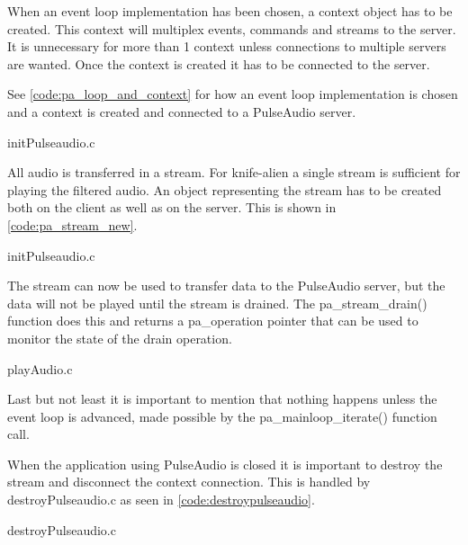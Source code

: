 \documentclass[journal]{IEEEtran}
\begin{document}
When an event loop implementation has been chosen, a context object has to be created. This context will multiplex events, commands and streams to the server. It is unnecessary for more than 1 context unless connections to multiple servers are wanted.
Once the context is created it has to be connected to the server.

See \autoref*{code:pa_loop_and_context} for how an event loop implementation is chosen and a context is created and connected to a PulseAudio server.


{initPulseaudio.c}

All audio is transferred in a stream. For knife-alien a single stream is sufficient for playing the filtered audio. An object representing the stream has to be created both on the client as well as on the server. This is shown in \autoref*{code:pa_stream_new}.


{initPulseaudio.c}

The stream can now be used to transfer data to the PulseAudio server, but the data will not be played until the stream is drained. The pa\_stream\_drain() function does this and returns a pa\_operation pointer that can be used to monitor the state of the drain operation.


{playAudio.c}

Last but not least it is important to mention that nothing happens unless the event loop is advanced, made possible by the pa\_mainloop\_iterate() function call.

When the application using PulseAudio is closed it is important to destroy the stream and disconnect the context connection. This is handled by destroyPulseaudio.c as seen in \autoref*{code:destroypulseaudio}.


{destroyPulseaudio.c}
\end{document}
